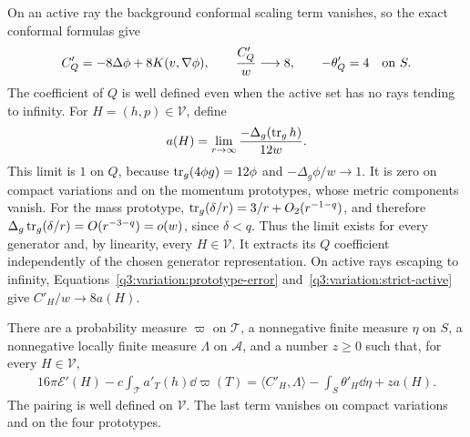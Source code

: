 On an active ray the background conformal scaling term vanishes, so
the exact conformal formulas give
\begin{equation}
 C'_Q=-8\Delta\phi+8K(v,\nabla\phi),\qquad
 \frac{C'_Q}{w}\longrightarrow8,
 \qquad -\theta'_Q=4\quad\hbox{on }S.
 \label{q3:variation:strict-active}
\end{equation}
The coefficient of $Q$ is well defined even when the active set has
no rays tending to infinity.  For $H=(h,p)\in\mathcal V$, define
\[
 a(H)=\lim_{r\to\infty}
       \frac{-\Delta_g(\operatorname{tr}_g h)}{12w}.
\]
This limit is $1$ on $Q$, because $\operatorname{tr}_g(4\phi g)=12\phi$ and
$-\Delta_g\phi/w\to1$.  It is zero on compact variations and
on the momentum prototypes, whose metric components vanish.
For the mass prototype,
$\operatorname{tr}_g(\delta/r)=3/r+O_2(r^{-1-q})$, and therefore
$\Delta_g\operatorname{tr}_g(\delta/r)=O(r^{-3-q})=o(w)$, since $\delta<q$.
Thus the limit exists for every generator and, by linearity, every
$H\in\mathcal V$.  It extracts its $Q$ coefficient independently
of the chosen generator representation.
On active rays escaping to infinity,
Equations~\eqref{q3:variation:prototype-error}
and~\eqref{q3:variation:strict-active} give $C'_H/w\to8a(H)$.

\begin{lemma}
\label{q3:variation:separation}
There are a probability measure $\varpi$ on $\mathcal T$, a
nonnegative finite measure $\eta$ on $S$, a nonnegative locally finite
measure $\Lambda$ on $\mathcal A$, and a number $z\ge0$ such that,
for every $H\in\mathcal V$,
\begin{equation}
 \begin{split}
 16\pi\mathcal E'(H)
   -c\int_{\mathcal T} a'_T(h)\dd\varpi(T)
  =\langle C'_H,\Lambda\rangle
       -\int_S\theta'_H\dd\eta+z a(H).
 \end{split}
 \label{q3:variation:multiplier-identity}
\end{equation}
The pairing is well defined on $\mathcal V$.  The last term vanishes
on compact variations and on the four prototypes.
\end{lemma}

